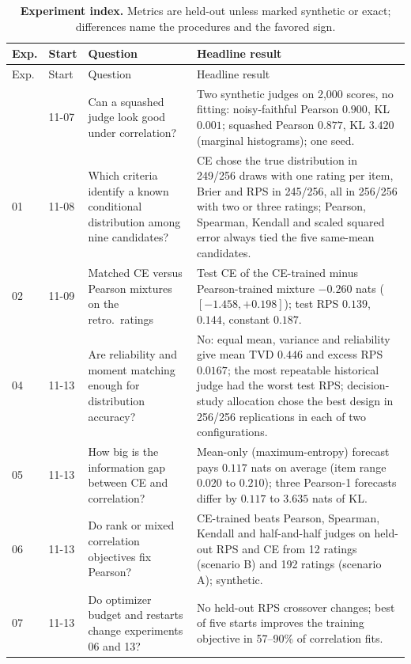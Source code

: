 {\small
\begin{longtable}{@{}p{}p{}p{}p{}@{}}
\caption{\textbf{Experiment index.} Metrics are held-out unless marked synthetic or exact; differences name the procedures and the favored sign.}\label{tab:index}\\
\toprule
Exp. & Start & Question & Headline result \\
\midrule
\endfirsthead
\toprule
Exp. & Start & Question & Headline result \\
\midrule
\endhead
\bottomrule
\endfoot
00 & 11-07 & Can a squashed judge look good under correlation? & Two synthetic judges on 2{,}000 scores, no fitting: noisy-faithful Pearson $0.900$, KL $0.001$; squashed Pearson $0.877$, KL $3.420$ (marginal histograms); one seed. \\
01 & 11-08 & Which criteria identify a known conditional distribution among nine candidates? & CE chose the true distribution in 249/256 draws with one rating per item, Brier and RPS in 245/256, all in 256/256 with two or three ratings; Pearson, Spearman, Kendall and scaled squared error always tied the five same-mean candidates. \\
02 & 11-09 & Matched CE versus Pearson mixtures on the retro.\ ratings & Test CE of the CE-trained minus Pearson-trained mixture $-0.260$ nats ($[-1.458,+0.198]$); test RPS $0.139$, $0.144$, constant $0.187$. \\
04 & 11-13 & Are reliability and moment matching enough for distribution accuracy? & No: equal mean, variance and reliability give mean TVD $0.446$ and excess RPS $0.0167$; the most repeatable historical judge had the worst test RPS; decision-study allocation chose the best design in 256/256 replications in each of two configurations. \\
05 & 11-13 & How big is the information gap between CE and correlation? & Mean-only (maximum-entropy) forecast pays $0.117$ nats on average (item range $0.020$ to $0.210$); three Pearson-1 forecasts differ by $0.117$ to $3.635$ nats of KL. \\
06 & 11-13 & Do rank or mixed correlation objectives fix Pearson? & CE-trained beats Pearson, Spearman, Kendall and half-and-half judges on held-out RPS and CE from 12 ratings (scenario B) and 192 ratings (scenario A); synthetic. \\
07 & 11-13 & Do optimizer budget and restarts change experiments 06 and 13? & No held-out RPS crossover changes; best of five starts improves the training objective in 57--90\% of correlation fits. \\

\end{longtable}}
